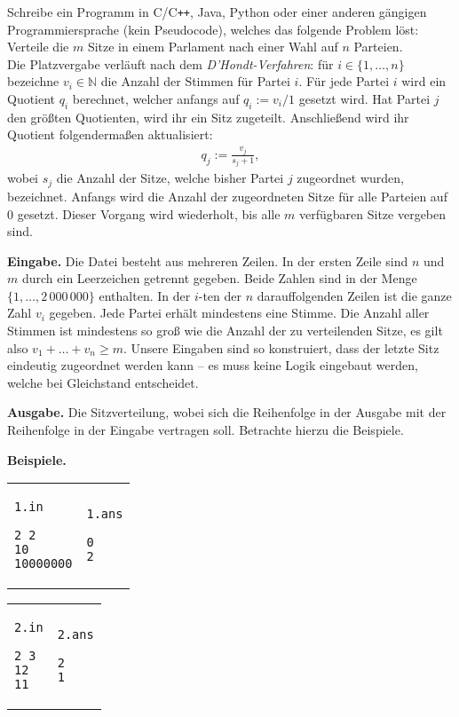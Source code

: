 \documentclass{uebung_cs}
\begin{document}
Schreibe ein Programm in C/C\texttt{++}, Java, Python oder einer anderen gängigen Programmiersprache (kein Pseudocode), welches das folgende Problem löst: 
Verteile die $m$ Sitze in einem Parlament nach einer Wahl auf $n$ Parteien.\\[0.25cm]
Die Platzvergabe verläuft nach dem \emph{D'Hondt-Verfahren}:
für $i \in \{1, \dots, n\}$ bezeichne $v_i \in \mathbb N$ die Anzahl der Stimmen für Partei $i$.
Für jede Partei $i$ wird ein Quotient $q_i$ berechnet, welcher anfangs auf $q_i := v_i/1$ gesetzt wird.
Hat Partei $j$ den größten Quotienten, wird ihr ein Sitz zugeteilt.
Anschließend wird ihr Quotient folgendermaßen aktualisiert:
\begin{align*}
    q_j := \frac{v_j}{s_j + 1},
\end{align*}
wobei $s_j$ die Anzahl der Sitze, welche bisher Partei $j$ zugeordnet wurden, bezeichnet.
Anfangs wird die Anzahl der zugeordneten Sitze für alle Parteien auf $0$ gesetzt.
Dieser Vorgang wird wiederholt, bis alle $m$ verfügbaren Sitze vergeben sind.

\textbf{Eingabe.}
Die Datei besteht aus mehreren Zeilen.
In der ersten Zeile sind $n$ und $m$ durch ein Leerzeichen getrennt gegeben.
Beide Zahlen sind in der Menge $\{1, \dots, 2\,000\,000\}$ enthalten.
In der $i$-ten der $n$ darauffolgenden Zeilen ist die ganze Zahl $v_i$ gegeben.
Jede Partei erhält mindestens eine Stimme.
Die Anzahl aller Stimmen ist mindestens so groß wie die Anzahl der zu verteilenden Sitze, es gilt also $v_1 + \dots + v_n \geq m$.
Unsere Eingaben sind so konstruiert, dass der letzte Sitz eindeutig zugeordnet werden kann -- es muss keine Logik eingebaut werden, welche bei Gleichstand entscheidet.

\textbf{Ausgabe.}
Die Sitzverteilung, wobei sich die Reihenfolge in der Ausgabe mit der Reihenfolge in der Eingabe vertragen soll. Betrachte hierzu die Beispiele.

\textbf{Beispiele.}\\
\begin{tabular}{p{}p{}}
\texttt{1.in}
\begin{verbatim}
2 2
10
10000000
\end{verbatim}
&
\texttt{1.ans}
\begin{verbatim}
0
2
\end{verbatim}
\end{tabular}

\begin{tabular}{p{}p{}}
\texttt{2.in}
\begin{verbatim}
2 3
12
11
\end{verbatim}
&
\texttt{2.ans}
\begin{verbatim}
2
1
\end{verbatim}
\end{tabular}
\end{document}
